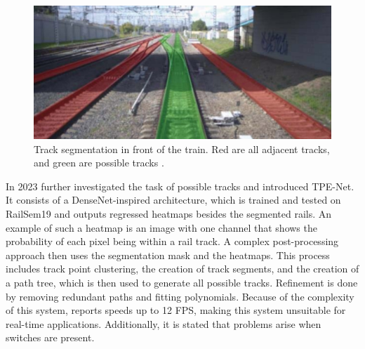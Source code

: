 \vspace{0.5cm}

\begin{figure}[H]
    \centering
    \includegraphics[width=0.5\linewidth]{PICs//semanticSegmentation/possibleTracks.jpg}
    \caption{Track segmentation in front of the train. Red are all adjacent tracks, and green are possible tracks \cite{RailraodSemanticPossibleTracks2020}.}
    \label{fig:possibleTracks}
\end{figure}

\vspace{0.5cm}

\noindent In 2023 \cite{TPENet2023} further investigated the task of possible tracks and introduced \ac{TPE-Net}.
It consists of a DenseNet-inspired \cite{DenseNets} architecture, which is trained and tested on RailSem19 and outputs regressed heatmaps besides the segmented rails.
An example of such a heatmap is an image with one channel that shows the probability of each pixel being within a rail track.
A complex post-processing approach then uses the segmentation mask and the heatmaps.
This process includes track point clustering, the creation of track segments, and the creation of a path tree, which is then used to generate all possible tracks.
Refinement is done by removing redundant paths and fitting polynomials.
Because of the complexity of this system, \cite{TPENet2023} reports speeds up to 12 \ac{FPS}, making this system unsuitable for real-time applications.
Additionally, it is stated that problems arise when switches are present.
